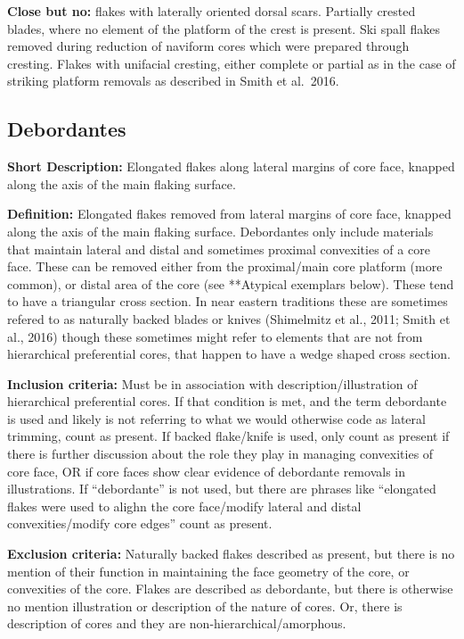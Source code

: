 \documentclass[
]{article}
\begin{document}
\textbf{Close but no:} flakes with laterally oriented dorsal scars.
Partially crested blades, where no element of the platform of the crest
is present. Ski spall flakes removed during reduction of naviform cores
which were prepared through cresting. Flakes with unifacial cresting,
either complete or partial as in the case of striking platform removals
as described in Smith et al.~2016.

\hypertarget{debordantes}{%
\subsection{Debordantes}\label{debordantes}}

\textbf{Short Description:} Elongated flakes along lateral margins of
core face, knapped along the axis of the main flaking surface.

\textbf{Definition:} Elongated flakes removed from lateral margins of
core face, knapped along the axis of the main flaking surface.
Debordantes only include materials that maintain lateral and distal and
sometimes proximal convexities of a core face. These can be removed
either from the proximal/main core platform (more common), or distal
area of the core (see **Atypical exemplars below). These tend to have a
triangular cross section. In near eastern traditions these are sometimes
refered to as naturally backed blades or knives (Shimelmitz et al.,
2011; Smith et al., 2016) though these sometimes might refer to elements
that are not from hierarchical preferential cores, that happen to have a
wedge shaped cross section.

\textbf{Inclusion criteria:} Must be in association with
description/illustration of hierarchical preferential cores. If that
condition is met, and the term debordante is used and likely is not
referring to what we would otherwise code as lateral trimming, count as
present. If backed flake/knife is used, only count as present if there
is further discussion about the role they play in managing convexities
of core face, OR if core faces show clear evidence of debordante
removals in illustrations. If ``debordante'' is not used, but there are
phrases like ``elongated flakes were used to alighn the core face/modify
lateral and distal convexities/modify core edges'' count as present.

\textbf{Exclusion criteria:} Naturally backed flakes described as
present, but there is no mention of their function in maintaining the
face geometry of the core, or convexities of the core. Flakes are
described as debordante, but there is otherwise no mention illustration
or description of the nature of cores. Or, there is description of cores
and they are non-hierarchical/amorphous.
\end{document}
